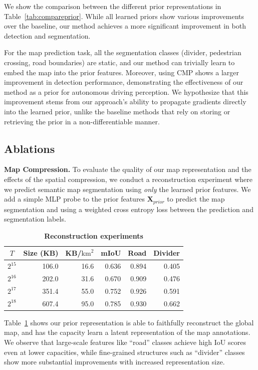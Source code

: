 \documentclass{article} %
\newcommand{\myparagraph}[1]{\vspace{0.2em}\noindent\textbf{#1}}
\newcommand{\xprior}{\ensuremath{\mathbf{X}_{prior}}}
\newcommand{\tablestyle}[2]{\setlength{\tabcolsep}{#1}\renewcommand{\arraystretch}{#2}\centering\small}
\newcommand{\ours}{CMP\xspace}
\begin{document}
We show the comparison between the different prior representations in Table~\ref{tab:compareprior}.
While all learned priors show various improvements over the baseline, our method achieves a more significant improvement in both detection and segmentation.

For the map prediction task, all the segmentation classes (divider, pedestrian crossing, road boundaries) are static, and our method can trivially learn to embed the map into the prior features.
Moreover, using \ours shows a larger improvement in detection performance, demonstrating the effectiveness of our method as a prior for autonomous driving perception.
We hypothesize that this improvement stems from our approach's ability to propagate gradients directly into the learned prior, unlike the baseline methods that rely on storing or retrieving the prior in a non-differentiable manner.

\subsection{Ablations}
\myparagraph{Map Compression.}
To evaluate the quality of our map representation and the effects of the spatial compression, we conduct a reconstruction experiment where we predict semantic map segmentation using \textit{only} the learned prior features.
We add a simple MLP probe to the prior features $\xprior$ to predict the map segmentation and using a weighted cross entropy loss between the prediction and segmentation labels.

\begin{table}[t]
	\tablestyle{5pt}{1.05}
	\centering
	\begin{tabular}{crrr|rr}
	\toprule
	$T$ & Size (KB) & KB/$\text{km}^2$ & mIoU & Road & Divider \\
	\midrule
	$2^{15}$ & 106.0 & 16.6 & 0.636 & 0.894 & 0.405 \\
	$2^{16}$ & 202.0 & 31.6 & 0.670 & 0.909 & 0.476 \\
	$2^{17}$ & 351.4 & 55.0 & 0.752 & 0.926 & 0.591 \\
	$2^{18}$ & 607.4 & 95.0 & 0.785 & 0.930 & 0.662 \\
	\bottomrule
	\end{tabular}
	\caption{
		\textbf{Reconstruction experiments}
	}
	\label{tab:ablation_memory_seg}
\end{table}

Table~\ref{tab:ablation_memory_seg} shows our prior representation is able to faithfully reconstruct the global map, and has the capacity learn a latent representation of the map annotations.
We observe that large-scale features like ``road'' classes achieve high IoU scores even at lower capacities, while fine-grained structures such as ``divider'' classes show more substantial improvements with increased representation size.
\end{document}
